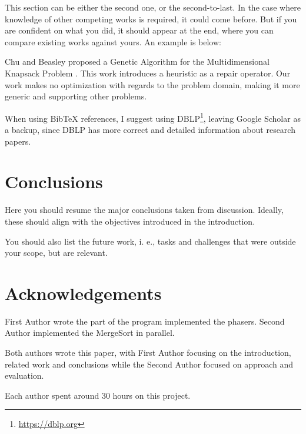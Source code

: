 \documentclass[runningheads]{llncs}
\begin{document}
This section can be either the second one, or the second-to-last. In the case where knowledge of other competing works is required, it could come before. But if you are confident on what you did, it should appear at the end, where you can compare existing works against yours. An example is below:

Chu and Beasley proposed a Genetic Algorithm for the Multidimensional Knapsack Problem \cite{DBLP:journals/heuristics/ChuB98}. This work introduces a heuristic as a repair operator. Our work makes no optimization with regards to the problem domain, making it more generic and supporting other problems.


When using BibTeX references, I suggest using DBLP\footnote{\url{https://dblp.org}}, leaving Google Scholar as a backup, since DBLP has more correct and detailed information about research papers.

\section{Conclusions}

Here you should resume the major conclusions taken from discussion. Ideally, these should align with the objectives introduced in the introduction.


You should also list the future work, i. e., tasks and challenges that were outside your scope, but are relevant.

\section*{Acknowledgements}

First Author wrote the part of the program implemented the phasers. Second Author implemented the MergeSort in parallel. 

Both authors wrote this paper, with First Author focusing on the introduction, related work and conclusions while the Second Author focused on approach and evaluation.

Each author spent around 30 hours on this project.



\end{document}
